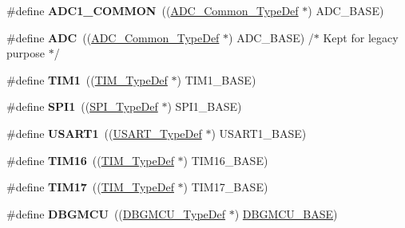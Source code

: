 \begin{DoxyCompactItemize}
\#define {\bfseries A\+D\+C1\+\_\+\+C\+O\+M\+M\+ON}~((\hyperlink{struct_a_d_c___common___type_def}{A\+D\+C\+\_\+\+Common\+\_\+\+Type\+Def} $\ast$) A\+D\+C\+\_\+\+B\+A\+SE)
\item 
\mbox{\label{group___peripheral__declaration_ga54d148b91f3d356713f7e367a2243bea}} 
\#define {\bfseries A\+DC}~((\hyperlink{struct_a_d_c___common___type_def}{A\+D\+C\+\_\+\+Common\+\_\+\+Type\+Def} $\ast$) A\+D\+C\+\_\+\+B\+A\+SE) /$\ast$ Kept for legacy purpose $\ast$/
\item 
\mbox{\label{group___peripheral__declaration_ga2e87451fea8dc9380056d3cfc5ed81fb}} 
\#define {\bfseries T\+I\+M1}~((\hyperlink{struct_t_i_m___type_def}{T\+I\+M\+\_\+\+Type\+Def} $\ast$) T\+I\+M1\+\_\+\+B\+A\+SE)
\item 
\mbox{\label{group___peripheral__declaration_gad483be344a28ac800be8f03654a9612f}} 
\#define {\bfseries S\+P\+I1}~((\hyperlink{struct_s_p_i___type_def}{S\+P\+I\+\_\+\+Type\+Def} $\ast$) S\+P\+I1\+\_\+\+B\+A\+SE)
\item 
\mbox{\label{group___peripheral__declaration_ga92871691058ff7ccffd7635930cb08da}} 
\#define {\bfseries U\+S\+A\+R\+T1}~((\hyperlink{struct_u_s_a_r_t___type_def}{U\+S\+A\+R\+T\+\_\+\+Type\+Def} $\ast$) U\+S\+A\+R\+T1\+\_\+\+B\+A\+SE)
\item 
\mbox{\label{group___peripheral__declaration_ga73ec606e7dacf17e18c661e8ff8c7c8d}} 
\#define {\bfseries T\+I\+M16}~((\hyperlink{struct_t_i_m___type_def}{T\+I\+M\+\_\+\+Type\+Def} $\ast$) T\+I\+M16\+\_\+\+B\+A\+SE)
\item 
\mbox{\label{group___peripheral__declaration_ga65aea6c8b36439e44ad6cde0e6891aab}} 
\#define {\bfseries T\+I\+M17}~((\hyperlink{struct_t_i_m___type_def}{T\+I\+M\+\_\+\+Type\+Def} $\ast$) T\+I\+M17\+\_\+\+B\+A\+SE)
\item 
\mbox{\label{group___peripheral__declaration_ga92ec6d9ec2251fda7d4ce09748cd74b4}} 
\#define {\bfseries D\+B\+G\+M\+CU}~((\hyperlink{struct_d_b_g_m_c_u___type_def}{D\+B\+G\+M\+C\+U\+\_\+\+Type\+Def} $\ast$) \hyperlink{group___peripheral__memory__map_ga4adaf4fd82ccc3a538f1f27a70cdbbef}{D\+B\+G\+M\+C\+U\+\_\+\+B\+A\+SE})

\end{DoxyCompactItemize}
